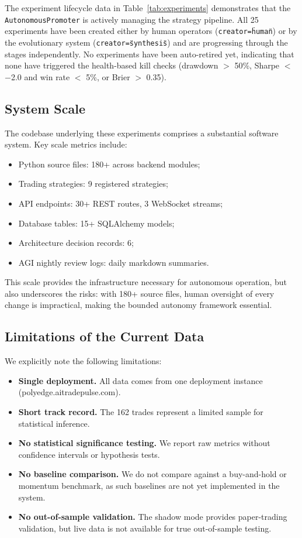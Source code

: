 The experiment lifecycle data in Table~\ref{tab:experiments} demonstrates that the \texttt{AutonomousPromoter} is actively managing the strategy pipeline. All 25 experiments have been created either by human operators (\texttt{creator=\"human\"}) or by the evolutionary system (\texttt{creator=\"synthesis\"}) and are progressing through the stages independently. No experiments have been auto-retired yet, indicating that none have triggered the health-based kill checks (drawdown $>$ 50\%, Sharpe $<$ $-$2.0 and win rate $<$ 5\%, or Brier $>$ 0.35).

\subsection{System Scale}

The codebase underlying these experiments comprises a substantial software system. Key scale metrics include:
\begin{itemize}
    \item Python source files: 180+ across backend modules;
    \item Trading strategies: 9 registered strategies;
    \item API endpoints: 30+ REST routes, 3 WebSocket streams;
    \item Database tables: 15+ SQLAlchemy models;
    \item Architecture decision records: 6;
    \item AGI nightly review logs: daily markdown summaries.
\end{itemize}

This scale provides the infrastructure necessary for autonomous operation, but also underscores the risks: with 180+ source files, human oversight of every change is impractical, making the bounded autonomy framework essential.

\subsection{Limitations of the Current Data}

We explicitly note the following limitations:
\begin{itemize}
    \item \textbf{Single deployment.} All data comes from one deployment instance (polyedge.aitradepulse.com).
    \item \textbf{Short track record.} The 162 trades represent a limited sample for statistical inference.
    \item \textbf{No statistical significance testing.} We report raw metrics without confidence intervals or hypothesis tests.
    \item \textbf{No baseline comparison.} We do not compare against a buy-and-hold or momentum benchmark, as such baselines are not yet implemented in the system.
    \item \textbf{No out-of-sample validation.} The shadow mode provides paper-trading validation, but live data is not available for true out-of-sample testing.
\end{itemize}

